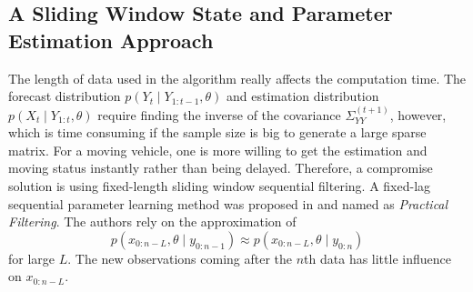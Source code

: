 %

\subsection{A Sliding Window State and Parameter Estimation Approach}

The length of data used in the algorithm really affects the computation time. The forecast distribution $p(Y_{t}\mid Y_{1:t-1},\theta)$ and estimation distribution $p(X_{t}\mid Y_{1:t},\theta)$ require finding the inverse of the covariance $\Sigma_{YY}^{(t+1)}$, however, which is time consuming if the sample size is big to generate a large sparse matrix. For a moving vehicle, one is more willing to get the estimation and moving status instantly rather than being delayed. Therefore, a compromise solution is using fixed-length sliding window sequential filtering. A fixed-lag sequential parameter learning method was proposed in \cite{polson2008practical} and named as \textit{Practical Filtering}. The authors rely on the approximation of 
\begin{equation*}
p(x_{0:n-L},\theta\mid y_{0:n-1}) \approx p(x_{0:n-L},\theta \mid y_{0:n})
\end{equation*}
for large $L$. The new observations coming after the $n$th data has little influence on $x_{0:n-L}$. 

